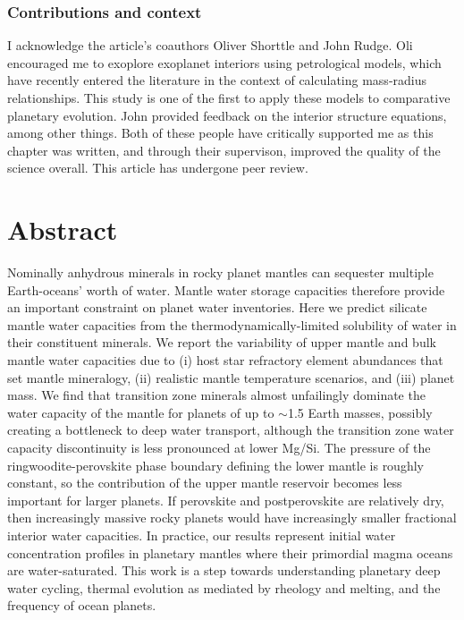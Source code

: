 \subsubsection*{Contributions and context}

I acknowledge the article's coauthors Oliver Shorttle and John Rudge. Oli encouraged me to exoplore exoplanet interiors using petrological models, which have recently entered the literature in the context of calculating mass-radius relationships. This study is one of the first to apply these models to comparative planetary evolution. John provided feedback on the interior structure equations, among other things. Both of these people have critically supported me as this chapter was written, and through their supervison, improved the quality of the science overall. This article has undergone peer review.




\section*{Abstract}
Nominally anhydrous minerals in rocky planet mantles can sequester multiple Earth-oceans' worth of water. Mantle water storage capacities therefore provide an important constraint on planet water inventories. Here we predict silicate mantle water capacities from the thermodynamically-limited solubility of water in their constituent minerals. We report the variability of upper mantle and bulk mantle water capacities due to (i) host star refractory element abundances that set mantle mineralogy, (ii) realistic mantle temperature scenarios, and (iii) planet mass. We find that transition zone minerals almost unfailingly dominate the water capacity of the mantle for planets of up to $\sim$1.5 Earth masses, possibly creating a bottleneck to deep water transport, although the transition zone water capacity discontinuity is less pronounced at lower Mg/Si. The pressure of the ringwoodite-perovskite phase boundary defining the lower mantle is roughly constant, so the contribution of the upper mantle reservoir becomes less important for larger planets. If perovskite and postperovskite are relatively dry, then increasingly massive rocky planets would have increasingly smaller fractional interior water capacities. In practice, our results represent initial water concentration profiles in planetary mantles where their primordial magma oceans are water-saturated. This work is a step towards understanding planetary deep water cycling, thermal evolution as mediated by rheology and melting, and the frequency of ocean planets.




